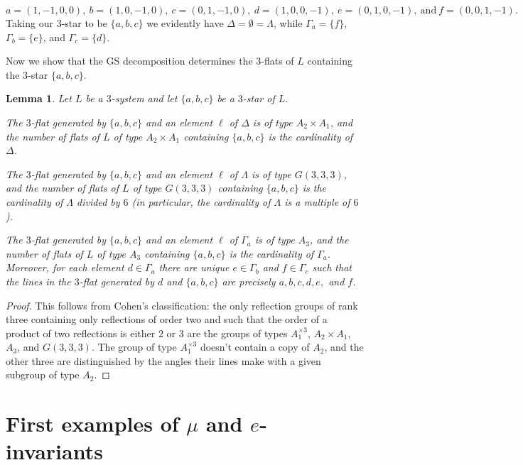 \documentclass[11pt, reqno]{amsart}
\numberwithin{equation}{section}
\theoremstyle{definition}
\theoremstyle{plain}
\newtheorem{lemma}[theorem]{Lemma}
\begin{document}
$$a=(1,-1,0,0), \ b=(1,0,-1,0), \ c=(0,1,-1,0), \ d=(1,0,0,-1), \ e=(0,1,0,-1), \ \text{and} \ f=(0,0,1,-1).$$ Taking our $3$-star to be $\{a,b,c \}$ we evidently have $\Delta=\emptyset=\Lambda$, while $\Gamma_a=\{ f \}$, $\Gamma_b=\{ e \}$, and $\Gamma_c=\{d \}$.


Now we show that the GS decomposition determines the $3$-flats of $L$ containing the $3$-star $\{a,b,c\}$.

\begin{lemma} Let $L$ be a $3$-system and let $\{a,b,c\}$ be a $3$-star of $L$.
\item[(a)] The $3$-flat generated by $\{a,b,c\}$ and an element $\ell$ of $\Delta$ is of type $A_2 \times A_1$, and the number of flats of $L$ of type $A_2 \times A_1$ containing $\{a,b,c\}$ is the cardinality of $\Delta$.

\item[(b)] The $3$-flat generated by $\{a,b,c\}$ and an element $\ell$ of $\Lambda$ is of type $G(3,3,3)$, and the number of flats  of $L$ of type $G(3,3,3)$ containing $\{a,b,c\}$ is the cardinality of $\Lambda$ divided by $6$ (in particular, the cardinality of $\Lambda$ is a multiple of $6$). 

\item[(c)] The $3$-flat generated by $\{a,b,c\}$ and an element $\ell$ of $\Gamma_a$ is of type $A_3$, and the number of flats of $L$ of type $A_3$ containing $\{a,b,c\}$ is the cardinality of $\Gamma_a$. Moreover, for each element $d \in \Gamma_a$ there are unique $e \in \Gamma_b$ and $f \in \Gamma_c$ such that the lines in the $3$-flat generated by $d$ and $\{a,b,c\}$ are precisely $a,b,c,d,e,$ and $f$.
\end{lemma}
\begin{proof}
This follows from Cohen's classification: the only reflection groups of rank three containing only reflections of order two and such that the order of a product of two reflections is either $2$ or $3$ are the groups of types $A_1^{\times 3}$, $A_2 \times A_1$, $A_3$, and $G(3,3,3)$. The group of type $A_1^{\times 3}$ doesn't contain a copy of $A_2$, and the other three are distinguished by the angles their lines make with a given subgroup of type $A_2$.
\end{proof}

\section{First examples of $\mu$ and $e$-invariants}
\end{document}
